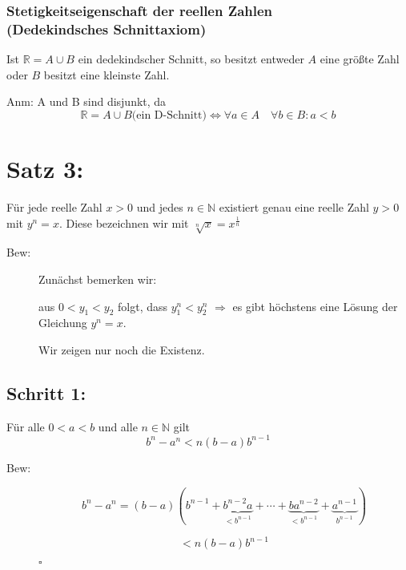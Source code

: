 \documentclass[12pt,a4paper,leqno]{article}
\begin{document}
  \subsubsection*{Stetigkeitseigenschaft der reellen Zahlen \\ (Dedekindsches Schnittaxiom)}
  
  Ist $\mathbb{R} = A \cup B$ ein dedekindscher Schnitt, so besitzt entweder $A$  eine größte Zahl oder $B$ besitzt eine kleinste Zahl. 
  
  
  Anm: A und B sind disjunkt, da 
  $$\mathbb{R} = A \cup B \textrm{(ein D-Schnitt)} \Leftrightarrow \forall a \in A \quad \forall b \in B : a < b$$
  
  
  
  \section*{Satz 3:} Für jede reelle Zahl $x>0$ und jedes $n\in \mathbb{N}$ existiert genau eine reelle Zahl $y>0$ mit $y^{n}=x$.
  Diese bezeichnen wir mit $\sqrt[n]{x}=x^{\frac{1}{n}}$
  
  \begin{description}
    \item[Bew:] Zunächst bemerken wir:
      
      aus $0<y_1<y_2$ folgt, dass $y_1^{n}<y_2^{n}$
      $\Rightarrow$ es gibt höchstens eine Lösung der Gleichung $y^{n}=x$.
      
      Wir zeigen nur noch die Existenz.
  \end{description}
  
  \subsection*{Schritt 1:} Für alle $0<a<b$ und alle $n \in \mathbb{N}$ gilt
  \renewcommand{\theequation}{*}
  \begin{equation}
    b^{n}-a^{n}<n(b-a)b^{n-1}
  \end{equation}
  
  \begin{description}
    \item[Bew:] $$b^{n}-a^{n}=(b-a)(b^{n-1}+\underbrace{b^{n-2}a}_{<b^{n-1}}+\cdots+\underbrace{ba^{n-2}}_{<b^{n-1}}+\underbrace{a^{n-1}}_{b^{n-1}})$$ 
      
      $$<n(b-a)b^{n-1}$$
      \begin{flushright} $ \square $ \end{flushright}
  \end{description}
  
\end{document}
